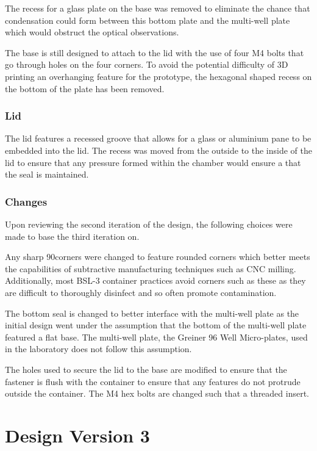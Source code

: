 \documentclass[class=report,11pt,crop=false]{standalone}
\begin{document}
The recess for a glass plate on the base was removed to eliminate the chance that condensation could form between this bottom plate and the multi-well plate which would obstruct the optical observations. 

The base is still designed to attach to the lid with the use of four M4 bolts that go through holes on the four corners. To avoid the potential difficulty of 3D printing an overhanging feature for the prototype, the hexagonal shaped recess on the bottom of the plate has been removed.

\subsubsection{Lid}
The lid features a recessed groove that allows for a glass or aluminium pane to be embedded into the lid. The recess was moved from the outside to the inside of the lid to ensure that any pressure formed within the chamber would ensure a that the seal is maintained.

\subsubsection{Changes}
Upon reviewing the second iteration of the design, the following choices were made to base the third iteration on.

Any sharp 90\degree corners were changed to feature rounded corners which better meets the capabilities of subtractive manufacturing techniques such as CNC milling. Additionally, most BSL-3 container practices avoid corners such as these as they are difficult to thoroughly disinfect and so often promote contamination.

The bottom seal is changed to better interface with the multi-well plate as the initial design went under the assumption that the bottom of the multi-well plate featured a flat base. The multi-well plate, the Greiner 96 Well Micro-plates, used in the laboratory does not follow this assumption. 

The holes used to secure the lid to the base are modified to ensure that the fastener is flush with the container to ensure that any features do not protrude outside the container. The M4 hex bolts are changed such that a threaded insert.

\section{Design Version 3}
\end{document}
